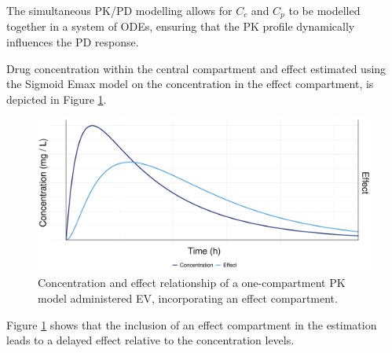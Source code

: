The simultaneous PK/PD modelling allows for $C_c$ and $C_p$ to be modelled together in a system of ODEs, ensuring that the PK profile dynamically influences the PD response.

Drug concentration within the central compartment and effect estimated using the Sigmoid Emax model on the concentration in the effect compartment, is depicted in Figure \ref{fig: PKPDmodel}.
\begin{figure}[H]
    \centering
    \includegraphics[width=0.95\linewidth]{fig/img/PD/PK-PDmodel.pdf}
    \caption{Concentration and effect relationship of a one-compartment PK model administered EV, incorporating an effect compartment.}
    \label{fig: PKPDmodel}
\end{figure}
Figure \ref{fig: PKPDmodel} shows that the inclusion of an effect compartment in the estimation leads to a delayed effect relative to the concentration levels. \citep{f11a2bf72b3e4305be6ebfffc456fc23}